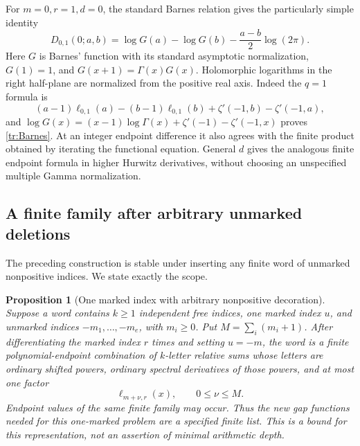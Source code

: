 \documentclass[11pt,letterpaper]{article}
\numberwithin{equation}{section}
\theoremstyle{plain}
\newtheorem{proposition}[theorem]{Proposition}
\theoremstyle{definition}
\theoremstyle{remark}
\begin{document}
For $m=0,r=1,d=0$, the standard Barnes relation
\cite{Vardi,DLMFBarnes} gives the particularly simple identity
\begin{equation}\label{tr:Barnes}
 \boxed{D_{0,1}(0;a,b)=
    \log G(a)-\log G(b)-\frac{a-b}{2}\log(2\pi).}
\end{equation}
Here $G$ is Barnes' function with its standard asymptotic normalization,
$G(1)=1$, and $G(x+1)=\Gamma(x)G(x)$. Holomorphic logarithms in the
right half-plane are normalized from the positive real axis.
Indeed the $q=1$ formula is
\[
 (a-1)\ell_{0,1}(a)-(b-1)\ell_{0,1}(b)
                    +\zeta'(-1,b)-\zeta'(-1,a),
\]
and
$\log G(x)=(x-1)\log\Gamma(x)+\zeta'(-1)-\zeta'(-1,x)$
proves \eqref{tr:Barnes}. At an integer endpoint difference it also
agrees with the finite product obtained by iterating the functional
equation. General $d$ gives the analogous finite endpoint formula in
higher Hurwitz derivatives, without choosing an unspecified multiple
Gamma normalization.

\subsection{A finite family after arbitrary unmarked deletions}

The preceding construction is stable under inserting any finite word
of unmarked nonpositive indices. We state exactly the scope.

\begin{proposition}[One marked index with arbitrary nonpositive decoration]
\label{tr:finitefamily}
Suppose a word contains $k\geq1$ independent free indices, one marked
index $u$, and unmarked indices $-m_1,\ldots,-m_e$, with $m_i\geq0$.
Put $M=\sum_i(m_i+1)$. After differentiating the marked index $r$ times
and setting $u=-m$, the word is a finite polynomial-endpoint combination
of $k$-letter relative sums whose letters are ordinary shifted powers,
ordinary spectral derivatives of those powers, and at most one factor
\[
 \ell_{m+\nu,r}(x),\qquad 0\leq\nu\leq M.
\]
Endpoint values of the same finite family may occur. Thus the new gap
functions needed for this one-marked problem are a specified finite
list. This is a bound for this representation, not an assertion of
minimal arithmetic depth.
\end{proposition}
\end{document}
